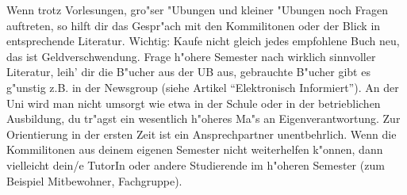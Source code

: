Wenn trotz Vorlesungen, gro"ser "Ubungen und kleiner "Ubungen noch Fragen
auftreten, so hilft dir das Gespr"ach mit den Kommilitonen oder der Blick in
entsprechende Literatur.
Wichtig: Kaufe nicht gleich jedes empfohlene Buch neu,
das ist Geldverschwendung. Frage h"ohere Semester nach wirklich sinnvoller
Literatur, leih' dir die B"ucher aus der UB aus, gebrauchte B"ucher gibt es
g"unstig z.B. in der Newsgroup  (siehe Artikel
"`Elektronisch Informiert"'). An der Uni wird man nicht umsorgt wie etwa in der
Schule oder in der betrieblichen Ausbildung, du tr"agst ein wesentlich h"oheres
Ma"s an Eigenverantwortung. Zur Orientierung in der ersten Zeit ist ein
Ansprechpartner unentbehrlich. Wenn die Kommilitonen aus
deinem eigenen Semester nicht weiterhelfen k"onnen, dann vielleicht dein/e TutorIn oder andere
Studierende im h"oheren Semester (zum Beispiel Mitbewohner, Fachgruppe).

